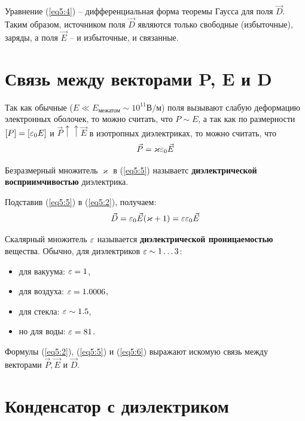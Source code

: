     Уравнение (\ref{eq5:4}) -- дифференциальная форма теоремы Гаусса для поля
    \( \vec{D} \). Таким образом, источником поля \( \vec{D} \) являются только
    свободные (избыточные), заряды, а поля \( \vec{E} \) -- и избыточные,
    и связанные.
     
\section{Связь между векторами \textbf{P}, \textbf{E} и \textbf{D}}

    Так как обычные (\( E \ll E_{\textit{межатом}} \sim
    10^{11} \text{В}/\text{м} \)) поля вызывают слабую деформацию
    электронных оболочек, то можно считать, что \( P \sim E \), а так как по
    размерности \( [P] = [\varepsilon_0E] \) и
    \( \vec{P} \uparrow\uparrow \vec{E} \) в изотропных диэлектриках, то можно
    считать, что
    \begin{equation}
        \vec{P} = \varkappa\varepsilon_0\vec{E} \label{eq5:5}
    \end{equation}
    
    Безразмерный множитель \( \varkappa \) в (\ref{eq5:5}) называетс
    \textbf{диэлектрической восприимчивостью} диэлектрика.
    
    Подставив (\ref{eq5:5}) в (\ref{eq5:2}), получаем:
    \begin{equation}
        \vec{D} = \varepsilon_0\vec{E}(\varkappa+1) =
        \varepsilon\varepsilon_0\vec{E}
        \label{eq5:6}
    \end{equation}
    
    Скалярный множитель \( \varepsilon \) называется
    \textbf{диэлектрической проницаемостью} вещества. Обычно, для диэлектриков
    \( \varepsilon \sim 1\ldots3\):
    \begin{itemize}
        \item для вакуума: \( \varepsilon = 1 \),
        \item для воздуха: \( \varepsilon = 1.0006 \),
        \item для стекла: \( \varepsilon \sim 1.5 \),
        \item но для воды: \( \varepsilon = 81 \).
    \end{itemize}
    
    Формулы (\ref{eq5:2}), (\ref{eq5:5}) и (\ref{eq5:6}) выражают искомую связь
    между векторами \( \vec{P}, \vec{E} \) и \( \vec{D} \).
    
\section{Конденсатор с диэлектриком}


